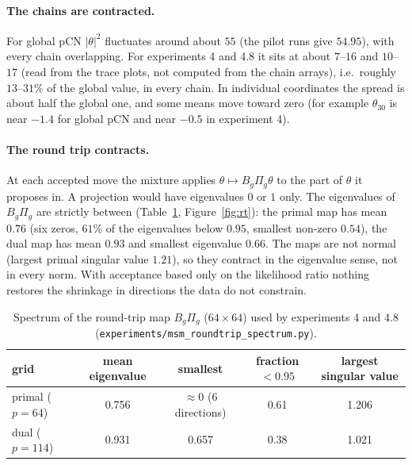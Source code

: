 \documentclass[11pt]{article}
\begin{document}
\paragraph{The chains are contracted.} For global pCN $|\theta|^2$ fluctuates around about $55$ (the pilot runs give $54.95$), with every chain overlapping. For experiments 4 and 4.8 it sits at about $7$--$16$ and $10$--$17$ (read from the trace plots, not computed from the chain arrays), i.e.\ roughly $13$--$31\%$ of the global value, in every chain. In individual coordinates the spread is about half the global one, and some means move toward zero (for example $\theta_{30}$ is near $-1.4$ for global pCN and near $-0.5$ in experiment 4).

\paragraph{The round trip contracts.} At each accepted move the mixture applies $\theta\mapsto B_g\Pi_g\theta$ to the part of $\theta$ it proposes in. A projection would have eigenvalues $0$ or $1$ only. The eigenvalues of $B_g\Pi_g$ are strictly between (Table~\ref{tab:rt}, Figure~\ref{fig:rt}): the primal map has mean $0.76$ (six zeros, $61\%$ of the eigenvalues below $0.95$, smallest non-zero $0.54$), the dual map has mean $0.93$ and smallest eigenvalue $0.66$. The maps are not normal (largest primal singular value $1.21$), so they contract in the eigenvalue sense, not in every norm. With acceptance based only on the likelihood ratio nothing restores the shrinkage in directions the data do not constrain.
\begin{table}[h]\centering\small
\begin{tabular}{@{}lcccc@{}}\toprule
grid & mean eigenvalue & smallest & fraction $<0.95$ & largest singular value\\ \midrule
primal ($p=64$) & 0.756 & $\approx0$ (6 directions) & 0.61 & 1.206\\
dual ($p=114$) & 0.931 & 0.657 & 0.38 & 1.021\\ \bottomrule
\end{tabular}
\caption{Spectrum of the round-trip map $B_g\Pi_g$ ($64\times64$) used by experiments 4 and 4.8 (\texttt{experiments/msm\_roundtrip\_spectrum.py}).}\label{tab:rt}
\end{table}
\end{document}
